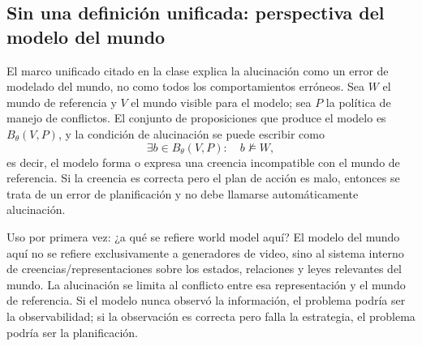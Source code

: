 
\subsection{Sin una definición unificada: perspectiva del modelo del mundo}

El marco unificado citado en la clase explica la alucinación como un error de modelado del mundo, no como todos los comportamientos erróneos. Sea $W$ el mundo de referencia y $V$ el mundo visible para el modelo; sea $P$ la política de manejo de conflictos. El conjunto de proposiciones que produce el modelo es $B_{\theta}(V,P)$, y la condición de alucinación se puede escribir como
\[
\exists b\in B_{\theta}(V,P):\quad b\not\models W,
\]
es decir, el modelo forma o expresa una creencia incompatible con el mundo de referencia. Si la creencia es correcta pero el plan de acción es malo, entonces se trata de un error de planificación y no debe llamarse automáticamente alucinación.





\begin{knowledgebox}{Uso por primera vez: ¿a qué se refiere world model aquí?}
El modelo del mundo aquí no se refiere exclusivamente a generadores de video, sino al sistema interno de creencias/representaciones sobre los estados, relaciones y leyes relevantes del mundo. La alucinación se limita al conflicto entre esa representación y el mundo de referencia. Si el modelo nunca observó la información, el problema podría ser la observabilidad; si la observación es correcta pero falla la estrategia, el problema podría ser la planificación.
\end{knowledgebox}

